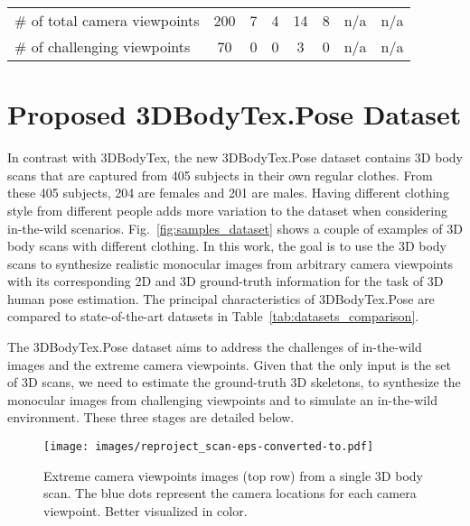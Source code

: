 \documentclass{article}
\begin{document}
\begin{table*}[t]
\begin{tabular}{|l|ccccccc|}
\# of total camera viewpoints   & 200                 & 7          & 4            & 14                      & 8            & n/a                 & n/a           \\ 
\# of challenging viewpoints & 70            & 0          & 0            & 3                       & 0            & n/a                 & n/a           \\ 
\hline
\end{tabular}
\caption{Comparison of datasets for the task of 3D human pose estimation. $(\star)$ indicates that clothing was synthetically added to the dataset.}
\label{tab:datasets_comparison}
\vspace{-0.1cm}
\end{table*}


\vspace{-0.1cm}
\section{Proposed 3DBodyTex.Pose Dataset}
\label{sec:proposeddataet}
\vspace{-0.1cm}
In contrast with 3DBodyTex, the new 3DBodyTex.Pose dataset contains 3D body scans that are captured from 405 subjects in their own regular clothes. From these 405 subjects, 204 are females and 201 are males. Having different clothing style from different people adds more variation to the dataset when considering in-the-wild scenarios. Fig.~\ref{fig:samples_dataset} shows a couple of examples of 3D body scans with different clothing. In this work, the goal is to use the 3D body scans to synthesize realistic monocular images from arbitrary camera viewpoints with its corresponding 2D and 3D ground-truth information for the task of 3D human pose estimation. The principal characteristics of 3DBodyTex.Pose are compared to state-of-the-art datasets in Table~\ref{tab:datasets_comparison}.

The 3DBodyTex.Pose dataset aims to address the challenges of in-the-wild images and the extreme camera viewpoints. Given that the only input is the set of 3D scans, we need to estimate the ground-truth 3D skeletons, to synthesize the monocular images from challenging viewpoints and to simulate an in-the-wild environment. These three stages are detailed below.
\begin{figure}[t]
    \vspace{-0.2cm}
    \centering
    \texttt{[image: images/reproject\_scan-eps-converted-to.pdf]}
    \caption{Extreme camera viewpoints images (top row) from a single 3D body scan. The blue dots represent the camera locations for each camera viewpoint. Better visualized in color.}
    \label{fig:camera_extreme_viewpoints}
    \vspace{-0.2cm}
\end{figure}
\end{document}
